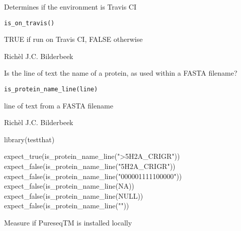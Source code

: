 \documentclass[letterpaper]{book}
\begin{document}
%
\begin{Description}\relax
Determines if the environment is Travis CI
\end{Description}
%
\begin{Usage}
\begin{verbatim}
is_on_travis()
\end{verbatim}
\end{Usage}
%
\begin{Value}
TRUE if run on Travis CI, FALSE otherwise
\end{Value}
%
\begin{Author}\relax
Richèl J.C. Bilderbeek
\end{Author}
%
\begin{Description}\relax
Is the line of text the name of a protein, as used within
a FASTA filename?
\end{Description}
%
\begin{Usage}
\begin{verbatim}
is_protein_name_line(line)
\end{verbatim}
\end{Usage}
%
\begin{Arguments}
\begin{ldescription}
\item[\code{line}] line of text from a FASTA filename
\end{ldescription}
\end{Arguments}
%
\begin{Author}\relax
Richèl J.C. Bilderbeek
\end{Author}
%
\begin{Examples}
\begin{ExampleCode}
library(testthat)

expect_true(is_protein_name_line(">5H2A_CRIGR"))
expect_false(is_protein_name_line("5H2A_CRIGR"))
expect_false(is_protein_name_line("000001111100000"))
expect_false(is_protein_name_line(NA))
expect_false(is_protein_name_line(NULL))
expect_false(is_protein_name_line(""))
\end{ExampleCode}
\end{Examples}
%
\begin{Description}\relax
Measure if PureseqTM is installed locally
\end{Description}
\end{document}

